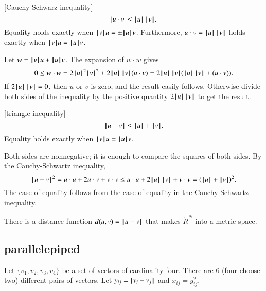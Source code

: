 \begin{lemma}[Cauchy-Schwarz inequality]
    $$|u \cdot v| \le \normo{u}\,\normo{v}.$$
Equality holds exactly when $\normo{v}u = \pm \normo{u}v$.  Furthermore,
$u\cdot v = \normo{u}\,\normo{v}$ holds exactly when $\normo{v} u = \normo{u} v$.
\end{lemma}

\begin{proved}
   Let $w = \normo{v} u \pm \normo{u} v$.  The expansion of $w\cdot w$ gives
    $$0\le w\cdot w = 2\normo{u}^2\normo{v}^2 \pm 2\normo{u}\, \normo{v} (u\cdot v) =
    2\normo{u}\,
    \normo{v} (\normo{u}\, \normo{v} \pm (u \cdot v)).$$
    If $2\normo{u} \,\normo{v} = 0$, then $u$ or $v$ is zero, and the result
    easily follows.  Otherwise divide both sides of the inequality
    by the positive quantity $2 \normo{u} \,\normo{v}$ to get the result.
\swallowed\end{proved}

\begin{lemma}[triangle inequality]
  $$
  \normo{u + v} \le \normo{u} + \normo{v }.
  $$
Equality holds exactly when $\normo{v}u = \normo{u}v$.
\end{lemma}

\begin{proved}
Both sides are nonnegative; it is enough to compare the squares of
both sides.  By the Cauchy-Schwartz inequality,
    $$\normo{u + v}^2 = u\cdot u + 2 u\cdot v + v\cdot v \le
      u\cdot u + 2 \normo{ u}\,\normo{v} + v\cdot v = (\normo{u}+\normo{v})^2.
    $$
The case of equality follows from the case of equality in the
Cauchy-Schwartz inequality.
\swallowed\end{proved}

There is a distance function $d(u,v) = \norm{ u }{ v}$ that makes
$\ring{R}^N$ into a metric space.  





\subsection{parallelepiped}

Let $\{v_1,v_2,v_3,v_4\}$ be a set of vectors of cardinality four.
There are $6$ (four choose two) different pairs of vectors. Let
$y_{ij} = \norm{v_i}{v_j}$ and $x_{ij}=y_{ij}^2$.

